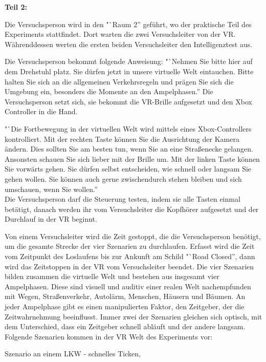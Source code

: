 \documentclass{Bericht}
\begin{document}
\textbf{Teil 2:} 

Die Versuchsperson wird in den "`Raum 2'' geführt, wo der praktische Teil des Experiments stattfindet. Dort warten die zwei Versuchsleiter von der VR. Währenddessen werten die ersten beiden Versuchsleiter den Intelligenztest aus.

Die Versuchsperson bekommt folgende Anweisung: "`Nehmen Sie bitte hier auf dem Drehstuhl platz. Sie dürfen jetzt in unsere virtuelle Welt eintauchen. Bitte halten Sie sich an die allgemeinen Verkehrsregeln und prägen Sie sich die Umgebung ein, besonders die Momente an den Ampelphasen.''
Die Versuchsperson setzt sich, sie bekommt die VR-Brille aufgesetzt und den Xbox Controller in die Hand.

"`Die Fortbewegung in der virtuellen Welt wird mittels eines Xbox-Controllers kontrolliert. Mit der rechten Taste können Sie die Ausrichtung der Kamera ändern. Dies sollten Sie am besten tun, wenn Sie an eine Straßenecke gelangen. Ansonsten schauen Sie sich lieber mit der Brille um. Mit der linken Taste können Sie vorwärts gehen. Sie dürfen selbst entscheiden, wie schnell oder langsam Sie gehen wollen. Sie können auch gerne zwischendurch stehen bleiben und sich umschauen, wenn Sie wollen.'' \\ 
Die Versuchsperson darf die Steuerung testen, indem sie alle Tasten einmal betätigt, danach werden ihr vom Versuchsleiter die Kopfhörer aufgesetzt und der Durchlauf in der VR beginnt. 

Von einem Versuchsleiter wird die Zeit gestoppt, die die Versuchsperson benötigt, um die gesamte Strecke der vier Szenarien zu durchlaufen. Erfasst wird die Zeit vom Zeitpunkt des Loslaufens bis zur Ankunft am Schild "`Road Closed'', dann wird das Zeitstoppen in der VR vom Versuchsleiter beendet. Die vier Szenarien bilden zusammen die virtuelle Welt und bestehen aus insgesamt vier Ampelphasen. Diese sind visuell und auditiv einer realen Welt nachempfunden mit Wegen, Straßenverkehr, Autolärm, Menschen, Häusern und Bäumen. An jeder Ampelphase gibt es einen manipulierten Faktor, den Zeitgeber, der die Zeitwahrnehmung beeinflusst. Immer zwei der Szenarien gleichen sich optisch, mit dem Unterschied, dass ein Zeitgeber schnell abläuft und der andere langsam. \\

Folgende Szenarien kommen in der VR Welt des Experiments vor:

Szenario an einem LKW - schnelles Ticken,
\end{document}
